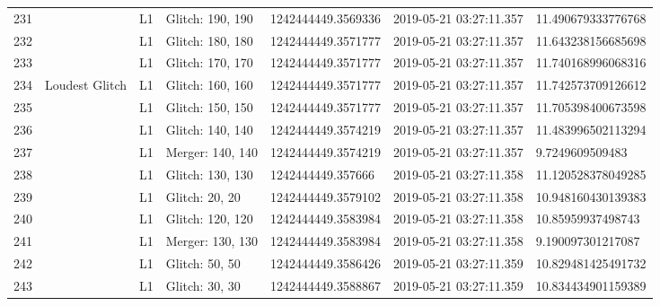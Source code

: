 \begin{longtable}{lllllll}
231  &                                                    &       L1 &  Glitch: 190, 190 &  1242444449.3569336 &  2019-05-21 03:27:11.357 &  11.490679333776768 \\
232  &                                                    &       L1 &  Glitch: 180, 180 &  1242444449.3571777 &  2019-05-21 03:27:11.357 &  11.643238156685698 \\
233  &                                                    &       L1 &  Glitch: 170, 170 &  1242444449.3571777 &  2019-05-21 03:27:11.357 &  11.740168996068316 \\
234  &                                     Loudest Glitch &       L1 &  Glitch: 160, 160 &  1242444449.3571777 &  2019-05-21 03:27:11.357 &  11.742573709126612 \\
235  &                                                    &       L1 &  Glitch: 150, 150 &  1242444449.3571777 &  2019-05-21 03:27:11.357 &  11.705398400673598 \\
236  &                                                    &       L1 &  Glitch: 140, 140 &  1242444449.3574219 &  2019-05-21 03:27:11.357 &  11.483996502113294 \\
237  &                                                    &       L1 &  Merger: 140, 140 &  1242444449.3574219 &  2019-05-21 03:27:11.357 &     9.7249609509483 \\
238  &                                                    &       L1 &  Glitch: 130, 130 &   1242444449.357666 &  2019-05-21 03:27:11.358 &  11.120528378049285 \\
239  &                                                    &       L1 &    Glitch: 20, 20 &  1242444449.3579102 &  2019-05-21 03:27:11.358 &  10.948160430139383 \\
240  &                                                    &       L1 &  Glitch: 120, 120 &  1242444449.3583984 &  2019-05-21 03:27:11.358 &   10.85959937498743 \\
241  &                                                    &       L1 &  Merger: 130, 130 &  1242444449.3583984 &  2019-05-21 03:27:11.358 &   9.190097301217087 \\
242  &                                                    &       L1 &    Glitch: 50, 50 &  1242444449.3586426 &  2019-05-21 03:27:11.359 &  10.829481425491732 \\
243  &                                                    &       L1 &    Glitch: 30, 30 &  1242444449.3588867 &  2019-05-21 03:27:11.359 &  10.834434901159389 \\

\end{longtable}
